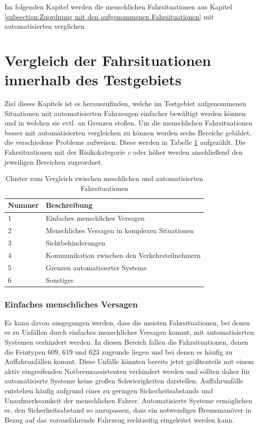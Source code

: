 Im folgenden Kapitel werden die menschlichen Fahrsituationen aus Kapitel \ref{subsection:Zuordnung mit den aufgenommenen Fahrsituationen} mit automatisierten verglichen. 

\section{Vergleich der Fahrsituationen innerhalb des Testgebiets}\label{section:Fahrsituationen im Vergleich}
Ziel dieses Kapitels ist es herauszufinden, welche im Testgebiet aufgenommenen Situationen  mit automatisierten Fahrzeugen einfacher bewältigt werden können und in welchen sie evtl. an Grenzen stoßen.
Um die menschlichen Fahrsituationen besser mit automatisierten vergleichen zu können werden sechs Bereiche gebildet, die verschiedene Probleme aufweisen. Diese werden in Tabelle \ref{tab:Cluster} aufgezählt. Die Fahrsituationen mit der Risikokategorie \textit{c} oder höher werden anschließend den jeweiligen Bereichen zugeordnet. 

\begin{table}[htpb]
	\scriptsize
	\caption[Cluster zum Vergleich zwischen meschlichen und automatisierten Fahrsituationen]{Cluster zum Vergleich zwischen meschlichen und automatisierten Fahrsituationen}\label{tab:Cluster}
	\centering
	\begin{tabular}{l l}
		\toprule
		Nummer & Beschreibung \\
		\midrule
		1 & Einfaches menschliches Versagen \\
		2 & Menschliches Versagen in komplexen Situationen \\
		3 & Sichtbehinderungen \\
		4 & Kommunikation zwischen den Verkehrsteilnehmern \\
		5 & Grenzen automatisierter Systeme \\
		6 & Sonstiges \\		 
		\bottomrule
	\end{tabular}
\end{table}

\subsubsection{Einfaches menschliches Versagen}
Es kann davon ausgegangen werden, dass die meisten Fahrsituationen, bei denen es zu Unfällen durch einfaches menschliches Versagen kommt, mit automatisierten Systemen verhindert werden. In diesen Bereich fallen die Fahrsituationen, denen die Feintypen 609, 619 und 623 zugrunde liegen und bei denen es häufig zu Auffahrunfällen kommt. Diese Unfälle könnten bereits jetzt größtenteils mit einem aktiv eingreifenden Notbremsassistenten verhindert werden und sollten daher für automatisierte Systeme keine großen Schwierigkeiten darstellen. Auffahrunfälle entstehen häufig aufgrund eines zu geringen Sicherheitsabstands und Unaufmerksamkeit der menschlichen Fahrer. Automatisierte Systeme ermöglichen es, den Sicherheitsabstand so anzupassen, dass ein notwendiges Bremsmanöver in Bezug auf das vorausfahrende Fahrzeug rechtzeitig eingeleitet werden kann.

